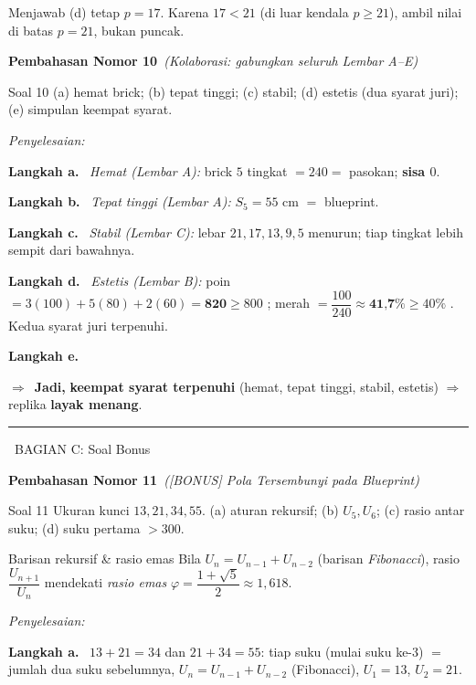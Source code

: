 \documentclass[11pt,a4paper]{article}
\newcommand{\jawab}{\par\smallskip\noindent\textit{\textcolor{oranye}{Penyelesaian:}}\par\smallskip}
\newcommand{\langkah}[1]{\par\smallskip\noindent\textbf{\textcolor{biru}{Langkah #1.}}\ }
\newcommand{\jadi}{\par\smallskip\noindent$\Rightarrow$\ \textbf{Jadi, }}
\newcommand{\bagianjudul}[1]{\par\bigskip\noindent%
  {\large\bfseries\color{ungu}\rule[-2pt]{4pt}{16pt}\ #1}\par\smallskip}
\newcommand{\nomorjudul}[2]{\par\bigskip\noindent%
  {\large\bfseries\color{ungu}Pembahasan Nomor #1}\ {\normalfont\itshape\color{gray}(#2)}\par\nopagebreak\smallskip}
\begin{document}
\begin{jebakan}
Menjawab (d) tetap $p=17$. Karena $17<21$ (di luar kendala $p\ge21$), ambil nilai
di batas $p=21$, bukan puncak.
\end{jebakan}

\nomorjudul{10}{Kolaborasi: gabungkan seluruh Lembar A--E}
\begin{soalbox}{Soal 10}
(a) hemat brick; (b) tepat tinggi; (c) stabil; (d) estetis (dua syarat juri);
(e) simpulan keempat syarat.
\end{soalbox}

\jawab
\langkah{a} \emph{Hemat (Lembar A):} brick $5$ tingkat $=240=$ pasokan; \textbf{sisa $0$}.

\langkah{b} \emph{Tepat tinggi (Lembar A):} $S_5=55$ cm $=$ blueprint. \checkmark

\langkah{c} \emph{Stabil (Lembar C):} lebar $21,17,13,9,5$ menurun; tiap tingkat
lebih sempit dari bawahnya. \checkmark

\langkah{d} \emph{Estetis (Lembar B):} poin $=3(100)+5(80)+2(60)=\textbf{820}\ge800$
\checkmark; merah $=\dfrac{100}{240}\approx\textbf{41{,}7\%}\ge40\%$ \checkmark.
Kedua syarat juri terpenuhi.

\langkah{e} \jadi \textbf{keempat syarat terpenuhi} (hemat, tepat tinggi, stabil,
estetis) $\Rightarrow$ replika \textbf{layak menang}.

\bagianjudul{BAGIAN C: Soal Bonus}

\nomorjudul{11}{[BONUS] Pola Tersembunyi pada Blueprint}
\begin{soalbox}{Soal 11}
Ukuran kunci $13,21,34,55$. (a) aturan rekursif; (b) $U_5,U_6$; (c) rasio antar
suku; (d) suku pertama $>300$.
\end{soalbox}

\begin{ingat}{Barisan rekursif \& rasio emas}
Bila $U_n=U_{n-1}+U_{n-2}$ (barisan \emph{Fibonacci}), rasio
$\dfrac{U_{n+1}}{U_n}$ mendekati \emph{rasio emas}
$\varphi=\dfrac{1+\sqrt5}{2}\approx1{,}618$.
\end{ingat}

\jawab
\langkah{a} $13+21=34$ dan $21+34=55$: tiap suku (mulai suku ke-$3$) $=$ jumlah dua
suku sebelumnya, \textbf{$U_n=U_{n-1}+U_{n-2}$} (Fibonacci), $U_1=13$, $U_2=21$.
\end{document}
